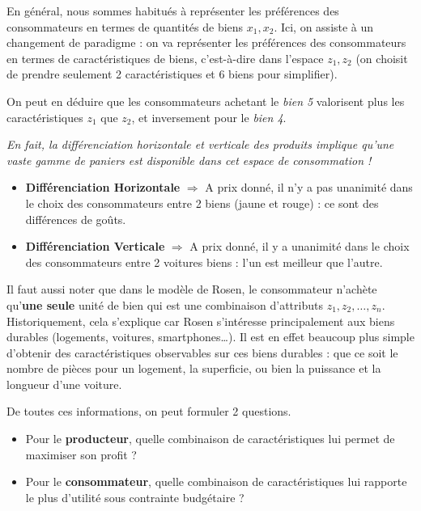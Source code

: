 \documentclass[
  12pt,
]{report}
\providecommand{\tightlist}{%
  \setlength{\itemsep}{0pt}\setlength{\parskip}{0pt}}\usepackage{longtable,booktabs,array}
\begin{document}
En général, nous sommes habitués à représenter les préférences des
consommateurs en termes de quantités de biens \(x_1, x_2\). Ici, on
assiste à un changement de paradigme : on va représenter les préférences
des consommateurs en termes de caractéristiques de biens, c'est-à-dire
dans l'espace \(z_1, z_2\) (on choisit de prendre seulement 2
caractéristiques et 6 biens pour simplifier).

On peut en déduire que les consommateurs achetant le \emph{bien 5}
valorisent plus les caractéristiques \(z_1\) que \(z_2\), et inversement
pour le \emph{bien 4}.

\emph{En fait, la différenciation horizontale et verticale des produits
implique qu'une vaste gamme de paniers est disponible dans cet espace de
consommation !}

\begin{itemize}
\item
  \textbf{Différenciation Horizontale} \(\Rightarrow\) A prix donné, il
  n'y a pas unanimité dans le choix des consommateurs entre 2 biens
  (jaune et rouge) : ce sont des différences de goûts.
\item
  \textbf{Différenciation Verticale} \(\Rightarrow\) A prix donné, il y
  a unanimité dans le choix des consommateurs entre 2 voitures biens :
  l'un est meilleur que l'autre.
\end{itemize}

Il faut aussi noter que dans le modèle de Rosen, le consommateur
n'achète qu'\textbf{une seule} unité de bien qui est une combinaison
d'attributs \(z_1, z_2, \dots, z_n\). Historiquement, cela s'explique
car Rosen s'intéresse principalement aux biens durables (logements,
voitures, smartphones\ldots). Il est en effet beaucoup plus simple
d'obtenir des caractéristiques observables sur ces biens durables : que
ce soit le nombre de pièces pour un logement, la superficie, ou bien la
puissance et la longueur d'une voiture.

De toutes ces informations, on peut formuler 2 questions.

\begin{itemize}
\tightlist
\item
  Pour le \textbf{producteur}, quelle combinaison de caractéristiques
  lui permet de maximiser son profit ?
\item
  Pour le \textbf{consommateur}, quelle combinaison de caractéristiques
  lui rapporte le plus d'utilité sous contrainte budgétaire ?
\end{itemize}
\end{document}
